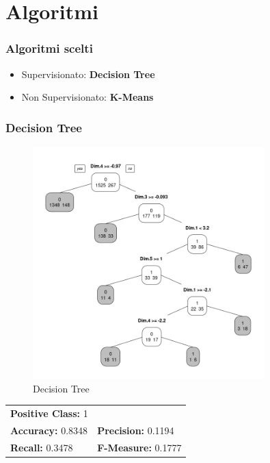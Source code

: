 \section{Algoritmi}
\begin{frame}[fragile]
\frametitle{Algoritmi scelti}
\begin{itemize}
    \item Supervisionato: \textbf{Decision Tree} 
    \item Non Supervisionato: \textbf{K-Means} 
\end{itemize}
\end{frame}

\begin{frame}[fragile]
\frametitle{Decision Tree}
\begin{minipage}{0.45\textwidth}
\begin{figure}
    \centering
    \includegraphics[width=0.8\textwidth]{Img/decision tree/D-TREE001.png}
    \caption{Decision Tree}
    \label{fig:DTREE1}
\end{figure}
\end{minipage}%
\hspace{2em}
\begin{minipage}{0.45\textwidth}

\begin{table}[h!]
\centering
\begin{tabular}{ll}
\multicolumn{2}{l}{\textbf{Positive Class:} 1} \\
\textbf{Accuracy:} 0.8348 & \textbf{Precision:} 0.1194\\
\textbf{Recall:} 0.3478 & \textbf{F-Measure:} 0.1777
\end{tabular}
\end{table}
\end{minipage}%
\end{frame}


